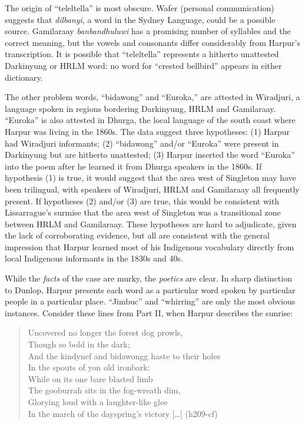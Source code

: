 \documentclass[
  Crown,
  times,
  sageh]{sagej}
\begin{document}
The origin of ``teleltella'' is most obscure. Wafer (personal
communication) suggests that \emph{dilbanyi}, a word in the Sydney
Language, could be a possible source. Gamilaraay \emph{banbandhuluwi}
has a promising number of syllables and the correct meaning, but the
vowels and consonants differ considerably from Harpur's transcription.
It is possible that ``teleltella'' represents a hitherto unattested
Darkinyung or HRLM word: no word for ``crested bellbird'' appears in
either dictionary.

The other problem words, ``bidawong'' and ``Euroka,'' are attested in
Wiradjuri, a language spoken in regions bordering Darkinyung, HRLM and
Gamilaraay. ``Euroka'' is also attested in Dhurga, the local language of
the south coast where Harpur was living in the 1860s. The data suggest
three hypotheses: (1) Harpur had Wiradjuri informants; (2) ``bidawong''
and/or ``Euroka'' were present in Darkinyung but are hitherto
unattested; (3) Harpur inserted the word ``Euroka'' into the poem after
he learned it from Dhurga speakers in the 1860s. If hypothesis (1) is
true, it would suggest that the area west of Singleton may have been
trilingual, with speakers of Wiradjuri, HRLM and Gamilaraay all
frequently present. If hypotheses (2) and/or (3) are true, this would be
consistent with Lissarrague's surmise that the area west of Singleton
was a transitional zone between HRLM and Gamilaraay. These hypotheses
are hard to adjudicate, given the lack of corroborating evidence, but
all are consistent with the general impression that Harpur learned most
of his Indigenous vocabulary directly from local Indigenous informants
in the 1830s and 40s.

While the \emph{facts} of the case are murky, the \emph{poetics} are
clear. In sharp distinction to Dunlop, Harpur presents each word as a
particular word spoken by particular people in a particular place.
``Jimbuc'' and ``whirring'' are only the most obvious instances.
Consider these lines from Part II, when Harpur describes the sunrise:

\begin{quote}
Uncovered no longer the forest dog prowls,\\
Though so bold in the dark;\\
And the kindynef and bidawongg haste to their holes\\
In the spouts of yon old ironbark:\\
While on its one bare blasted limb\\
The gooburrah sits in the fog-wreath dim,\\
Glorying loud with a laughter-like glee\\
In the march of the dayspring's victory {[}\ldots{]} (h209-cf)
\end{quote}
\end{document}

